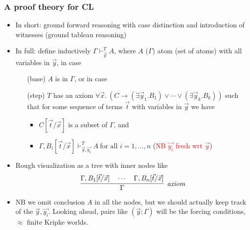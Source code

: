 \documentclass[handout,11pt]{beamer}
\newcommand{\red}[1]{\textcolor{red}{#1}}
\begin{document}
\begin{frame}
\frametitle{A proof theory for CL}
 \begin{itemize}[<+->]   %
    \item In short: ground forward reasoning with case distinction and
    introduction of witnesses (ground tableau reasoning)
    \item In full: define inductively $\Gamma\vdash_{\vec{y}}^T A$, where 
    $A$ ($\Gamma$) atom (set of atoms) with all variables in $\vec{y}$, in case
    \begin{enumerate}
    \item[(base)] $A$ is in $\Gamma$, or in case 
    \item[(step)] $T$ has an axiom $\forall\vec{x}.~
    (C \to (\exists\vec{y}_1.B_1) \lor \cdots \lor (\exists\vec{y}_k.B_k))$
    such that for some sequence of terms $\vec{t}$ with variables in $\vec{y}$
    we have
    \begin{itemize}
    \item $C[\vec{t}/\vec{x}]$ is a subset of $\Gamma$, and
    \item $\Gamma,B_i[\vec{t}/\vec{x}]\vdash^T_{\vec{y},\vec{y_i}} A
          ~\text{for all $i = 1,\dots,n$}$ \quad
          (\red{NB $\vec{y_i}$ fresh wrt $\vec{y}$})
    \end{itemize}
    \end{enumerate}
    \item Rough visualization as a tree with inner nodes like 
    \[
\infer[\mathit{axiom}]{\Gamma}{\Gamma,B_1[\vec{t}/\vec{x}] \quad\cdots\quad \Gamma,B_n[\vec{t}/\vec{x}]}
    \]
    \item NB we omit conclusion $A$ in all the nodes, 
    but we should actually keep track of the $\vec{y},\vec{y_i}$.
    Looking ahead, pairs like $(\vec{y};\Gamma)$ will be
    the forcing conditions, $\approx$ finite Kripke worlds.
 \end{itemize}
\end{frame}
\end{document}
